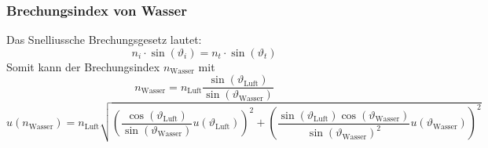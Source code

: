 \documentclass[
	a4paper,
	12pt,
	pagesize,
	ngerman
]{scrartcl}
\begin{document}
	\subsubsection{Brechungsindex von Wasser}
	Das Snelliussche Brechungsgesetz lautet:
	\begin{equation}
		n_i \cdot \sin(\vartheta_i) = n_t \cdot \sin(\vartheta_t)
		\label{eq_snellius}
	\end{equation}
	Somit kann der Brechungsindex $n_\text{Wasser}$  mit 
	\begin{equation}
		n_\text{Wasser} = n_\text{Luft}\frac{\sin(\vartheta_\text{Luft})}{\sin(\vartheta_\text{Wasser})}
	\end{equation}
	\begin{equation}
		u(n_\text{Wasser}) = n_\text{Luft} \sqrt{\left(\frac{\cos(\vartheta_\text{Luft})}{\sin(\vartheta_\text{Wasser})} u(\vartheta_\text{Luft})\right)^2 + \left(\frac{\sin(\vartheta_\text{Luft})\cos( \vartheta_\text{Wasser})}{\sin(\vartheta_\text{Wasser})^2}u(\vartheta_\text{Wasser})\right)^2}
	\end{equation}
\end{document}
